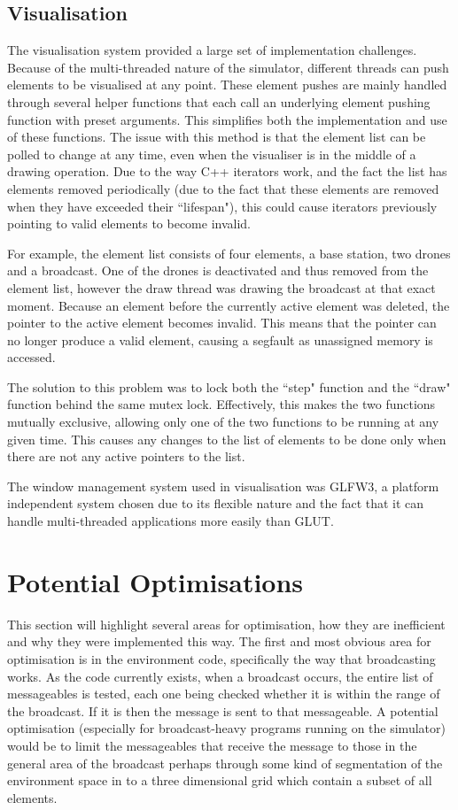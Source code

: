 	\subsection{Visualisation}
		The visualisation system provided a large set of implementation challenges. Because of the multi-threaded nature
		of the simulator, different threads can push elements to be visualised at any point. These element pushes are mainly
		handled through several helper functions that each call an underlying element pushing function with preset arguments.
		This simplifies both the implementation and use of these functions. The issue with this method is that the element list
		can be polled to change at any time, even when the visualiser is in the middle of a drawing operation. Due to the way
		C++ iterators work, and the fact the list has elements removed periodically (due to the fact that these elements are removed when they
		have exceeded their ``lifespan"), this could cause iterators previously pointing to valid elements to become invalid.

		For example, the element list consists of four elements, a base station, two drones and a broadcast. One of the drones is
		deactivated and thus removed from the element list, however the draw thread was drawing the broadcast at that exact
		moment. Because an element before the currently active element was deleted, the pointer to the active element becomes
		invalid. This means that the pointer can no longer produce a valid element, causing a segfault as unassigned
		memory is accessed.

		The solution to this problem was to lock both the ``step" function and the ``draw" function behind the same mutex lock.
		Effectively, this makes the two functions mutually exclusive, allowing only one of the two functions to be running at any
		given time. This causes any changes to the list of elements to be done only when there are not any active pointers to the
		list.

		The window management system used in visualisation was GLFW3, a platform independent system chosen due to its flexible
		nature and the fact that it can handle multi-threaded applications more easily than GLUT.

\section{Potential Optimisations}
	This section will highlight several areas for optimisation, how they are inefficient and why they were implemented this way.
	The first and most obvious area for optimisation is in the environment code, specifically the way that broadcasting works. As the
	code currently exists, when a broadcast occurs, the entire list of messageables is tested, each one being checked whether it is
	within the range of the broadcast. If it is then the message is sent to that messageable. A potential optimisation 
	(especially for broadcast-heavy programs running on the simulator) would be to limit the messageables that receive the
	message to those in the general area of the broadcast perhaps through some kind of segmentation of the environment space in to
	a three dimensional grid which contain a subset of all elements.

